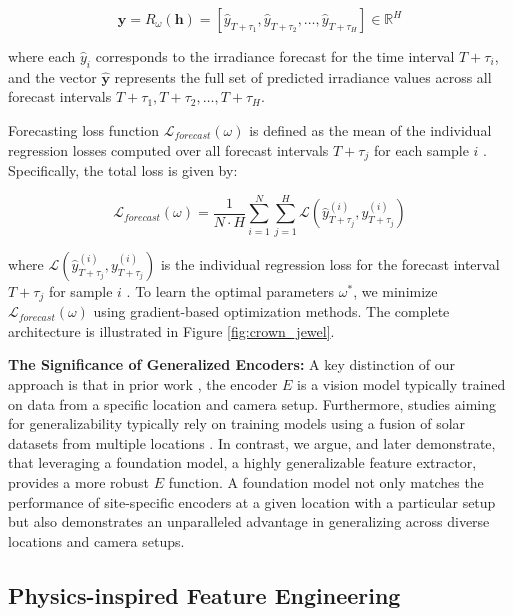 \[
\hat{\mathbf{y}} = R_\omega(\mathbf{h}) = \left[ \hat{y}_{T+\tau_1}, \hat{y}_{T+\tau_2}, \dots, \hat{y}_{T+\tau_H} \right] \in \mathbb{R}^H
\]

where each \( \hat{y}_{i} \) corresponds to the irradiance forecast for the time interval \( T + \tau_i \), and the vector \( \hat{\mathbf{y}} \) represents the full set of predicted irradiance values across all forecast intervals \( T + \tau_1, T + \tau_2, \dots, T + \tau_H \).



Forecasting loss function \( \mathcal{L}_{forecast}(\omega) \) is defined as the mean of the individual regression losses computed over all forecast intervals \( T + \tau_j \) for each sample \( i \) . Specifically, the total loss is given by:

\[
\mathcal{L}_{forecast}(\omega) = \frac{1}{N \cdot H} \sum_{i=1}^N \sum_{j=1}^H \mathcal{L}(\hat{y}^{(i)}_{T+\tau_j}, y^{(i)}_{T+\tau_j})
\]


where \( \mathcal{L}(\hat{y}^{(i)}_{T+\tau_j}, y^{(i)}_{T+\tau_j}) \)  is the individual regression loss for the forecast interval \( T + \tau_j \) for sample \( i \) . To learn the optimal parameters \( \omega^* \), we minimize \( \mathcal{L}_{forecast}(\omega) \) using gradient-based optimization methods. The complete architecture is illustrated in Figure \ref{fig:crown_jewel}.



\textbf{The Significance of Generalized Encoders:}
A key distinction of our approach is that in prior work \cite{wacv2022, prior_methods_site_specific, talha2019}, the encoder \( E \) is a vision model typically trained on data from a specific location and camera setup. Furthermore, studies aiming for generalizability typically rely on training models using a fusion of solar datasets from multiple locations \cite{yuhao_transfer_learning, site_specific_trained_transfer_learning}. In contrast, we argue, and later demonstrate, that leveraging a foundation model, a highly generalizable feature extractor, provides a more robust \( E \) function. A foundation model not only matches the performance of site-specific encoders at a given location with a particular setup but also demonstrates an unparalleled advantage in generalizing across diverse locations and camera setups.

\subsection{Physics-inspired Feature Engineering}
\label{subsec:physics_inspired}

